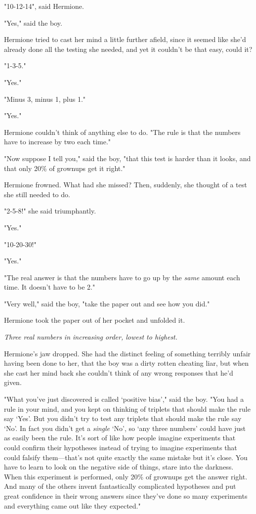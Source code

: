 "10-{12}-{14}", said Hermione.

"Yes," said the boy.

Hermione tried to cast her mind a little further afield, since it seemed like 
she'd already done all the testing she needed, and yet it couldn't be that 
easy, could it?

"1-{3}-{5}."

"Yes."

"Minus 3, minus 1, plus 1."

"Yes."

Hermione couldn't think of anything else to do. "The rule is that the numbers 
have to increase by two each time."

"Now suppose I tell you," said the boy, "that this test is harder than it 
looks, and that only 20\% of grownups get it right."

Hermione frowned. What had she missed? Then, suddenly, she thought of a test 
she still needed to do.

"2-{5}-{8}!" she said triumphantly.

"Yes."

"10-{20}-{30}!"

"Yes."

"The real answer is that the numbers have to go up by the \emph{same} amount 
each time. It doesn't have to be 2."

"Very well," said the boy, "take the paper out and see how you did."

Hermione took the paper out of her pocket and unfolded it.

\emph{Three real numbers in increasing order, lowest to highest.}

Hermione's jaw dropped. She had the distinct feeling of something terribly 
unfair having been done to her, that the boy was a dirty rotten cheating liar, 
but when she cast her mind back she couldn't think of any wrong responses that 
he'd given.

"What you've just discovered is called `positive bias'," said the boy. "You had 
a rule in your mind, and you kept on thinking of triplets that should make the 
rule say `Yes'. But you didn't try to test any triplets that should make the 
rule say `No'. In fact you didn't get a \emph{single} `No', so `any three 
numbers' could have just as easily been the rule. It's sort of like how people 
imagine experiments that could confirm their hypotheses instead of trying to 
imagine experiments that could falsify them---that's not quite exactly the same 
mistake but it's close. You have to learn to look on the negative side of 
things, stare into the darkness. When this experiment is performed, only 20\% of 
grownups get the answer right. And many of the others invent fantastically 
complicated hypotheses and put great confidence in their wrong answers since 
they've done so many experiments and everything came out like they expected."

